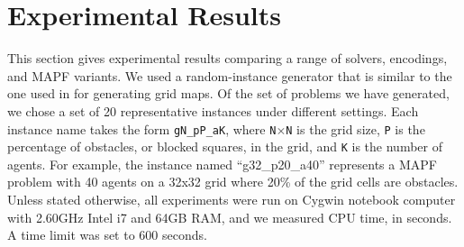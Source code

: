 \documentclass[conference]{IEEEtran}
\begin{document}
\section{Experimental Results}
This section gives experimental results
comparing a range of solvers, encodings, and MAPF variants. 
We used a random-instance generator that is similar to the one used in \cite{Surynek14} for generating grid maps. 
Of the set of problems we have generated, we chose a set of 20 representative instances under different settings. 
Each instance name takes the form \texttt{gN\_pP\_aK}, where \texttt{N}$\times$\texttt{N} is the grid size, \texttt{P} is the percentage of obstacles, or blocked squares, in the grid, and \texttt{K} is the number of agents. For example, the instance named ``g32\_p20\_a40'' represents a MAPF problem with 40 agents 
on a 32x32 grid 
where 20\% of the grid cells are obstacles. 
Unless stated otherwise, all experiments were run on Cygwin notebook computer with 2.60GHz Intel i7 and 64GB RAM,
and we measured CPU time, in seconds. A time limit was set to 600 seconds.



\end{document}

